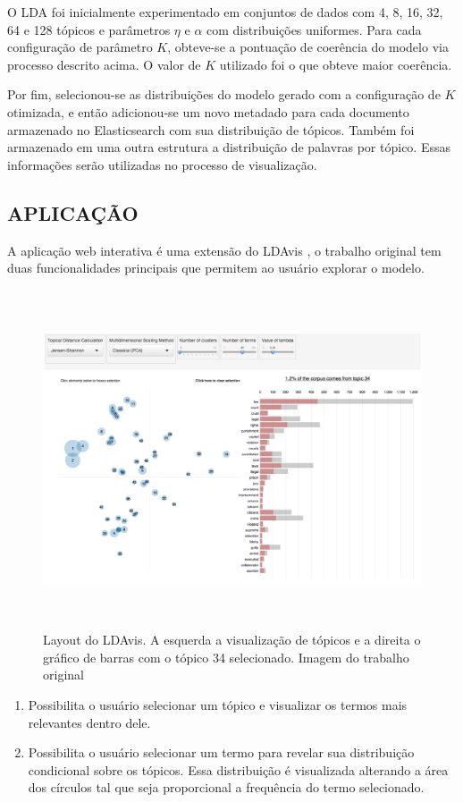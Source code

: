 \documentclass[12pt,a4paper]{article}
\begin{document}
O LDA foi inicialmente experimentado em conjuntos de dados com 4, 8, 16, 32, 64 e 128 tópicos e parâmetros $\eta$ e $\alpha$ com distribuições uniformes. Para cada configuração de parâmetro $K$,
 obteve-se a pontuação de coerência do modelo via processo descrito acima. O valor de $K$ utilizado foi o que obteve maior coerência.

Por fim, selecionou-se as distribuições do modelo gerado com a configuração de $K$ otimizada, e então adicionou-se um novo metadado para cada documento armazenado no Elasticsearch com sua distribuição de tópicos.
 Também foi armazenado em uma outra estrutura a distribuição de palavras por tópico. Essas informações serão utilizadas no processo de visualização.

\subsection{APLICAÇÃO}
A aplicação web interativa é uma extensão do LDAvis \cite{sievert2014ldavis}, o trabalho original tem duas funcionalidades principais
que permitem ao usuário explorar o modelo.

\begin{figure}[H]
	\centering
    \includegraphics[height=10cm]{images/figure_4.png}
    \caption{Layout do LDAvis. A esquerda a visualização de tópicos e a direita o gráfico de barras com o tópico 34 selecionado. Imagem do trabalho original \cite{sievert2014ldavis}}
\end{figure}


\begin{enumerate}
  \item Possibilita o usuário selecionar um tópico e visualizar os termos mais relevantes dentro dele.
  \item Possibilita o usuário selecionar um termo para revelar sua distribuição condicional sobre os tópicos. Essa distribuição
  é visualizada alterando a área dos círculos tal que seja proporcional a frequência do termo selecionado.
\end{enumerate}
\end{document}
